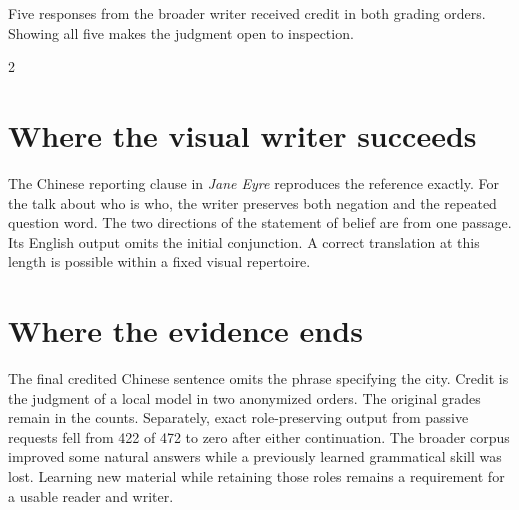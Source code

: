\newpage
{}
\noindent Five responses from the broader writer received credit in both grading orders. Showing all five makes the judgment open to inspection.
\begin{multicols}{2}
\section*{Where the visual writer succeeds}
The Chinese reporting clause in \textit{Jane Eyre} reproduces the reference exactly. For the talk about who is who, the writer preserves both negation and the repeated question word. The two directions of the statement of belief are from one passage. Its English output omits the initial conjunction. A correct translation at this length is possible within a fixed visual repertoire.
\section*{Where the evidence ends}
The final credited Chinese sentence omits the phrase specifying the city. Credit is the judgment of a local model in two anonymized orders. The original grades remain in the counts. Separately, exact role-preserving output from passive requests fell from 422 of 472 to zero after either continuation. The broader corpus improved some natural answers while a previously learned grammatical skill was lost. Learning new material while retaining those roles remains a requirement for a usable reader and writer.
\end{multicols}
